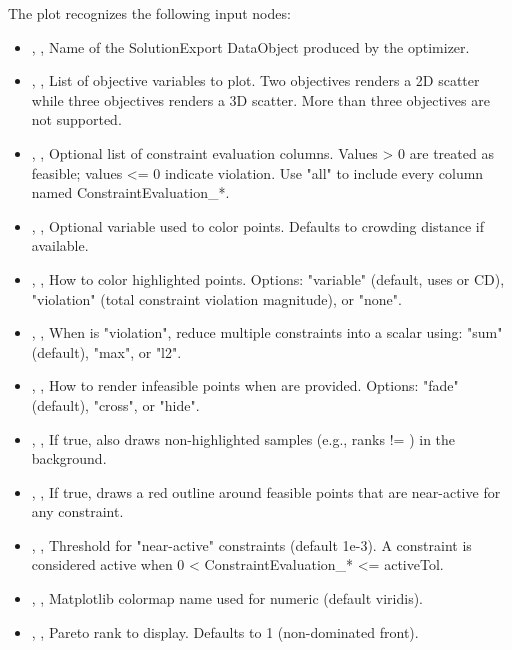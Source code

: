 The  plot recognizes the following input nodes:
\begin{itemize}
  \item {}, , Name of the SolutionExport DataObject produced by the optimizer.
  \item {}, , List of objective variables to plot. Two objectives renders a 2D scatter while three objectives renders a 3D scatter. More than three objectives are not supported.
  \item {}, , Optional list of constraint evaluation columns. Values \textgreater{} 0 are treated as feasible; values \textless{}= 0 indicate violation. Use "all" to include every column named ConstraintEvaluation\_*.
  \item {}, , Optional variable used to color points. Defaults to crowding distance if available.
  \item {}, , How to color highlighted points. Options: "variable" (default, uses  or CD), "violation" (total constraint violation magnitude), or "none".
  \item {}, , When  is "violation", reduce multiple constraints into a scalar using: "sum" (default), "max", or "l2".
  \item {}, , How to render infeasible points when  are provided. Options: "fade" (default), "cross", or "hide".
  \item {}, , If true, also draws non-highlighted samples (e.g., ranks != ) in the background.
  \item {}, , If true, draws a red outline around feasible points that are near-active for any constraint.
  \item {}, , Threshold for "near-active" constraints (default 1e-3). A constraint is considered active when 0 \textless{} ConstraintEvaluation\_* \textless{}= activeTol.
  \item {}, , Matplotlib colormap name used for numeric  (default viridis).
  \item {}, , Pareto rank to display. Defaults to 1 (non-dominated front).
\end{itemize}

